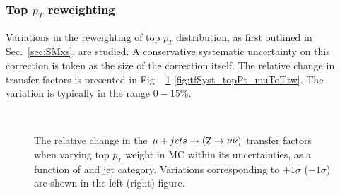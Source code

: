 \subsubsection*{Top $p_T$ reweighting}
\label{sec:tfSyst_topPt}

Variations in the reweighting of top $p_{T}$ distribution, as first outlined in 
Sec.~\ref{sec:SMxs}, are studied. A conservative systematic
uncertainty on this correction is taken as the size of the correction itself. 
The relative change in transfer factors is presented in Fig.
~\ref{fig:tfSyst_topPt_muToZinv}-\ref{fig:tfSyst_topPt_muToTtw}. The
variation is typically in the range $0-15\%$.

\begin{figure}[!h]
  \centering
   ~~
  \\

  \caption{\label{fig:tfSyst_topPt_muToZinv} The relative change in
  the $\mu + jets \rightarrow ({\text Z} \rightarrow \nu\bar{\nu})$ transfer
  factors when varying top $p_{T}$ weight in MC within its uncertainties, as a function of \scalht and jet category. 
  Variations corresponding to $+1\sigma$ ($-1\sigma$) are shown in the left (right) figure. 
  }
\end{figure}

